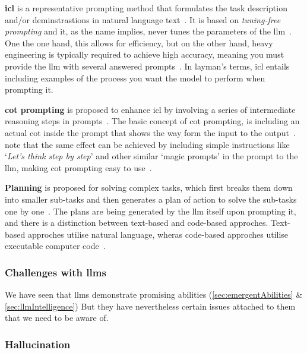\textbf{\acrfull{icl}} is a representative prompting method that formulates the task
description and/or deminstrastions in natural language text~\cite[44]{llmSurvey}. It is based on
\textit{tuning-free prompting} and it, as the name implies, never tunes the parameters of the
\acrshort{llm}~\cite[15]{promptingSurvey}. One the one hand, this allows for efficiency, but on the
other hand, heavy engineering is typically required to achieve high accuracy, meaning you must
provide the \acrshort{llm} with several answered prompts~\cite[16]{promptingSurvey}. In layman's
terms, \acrshort{icl} entails including examples of the process you want the model to perform when
prompting it.

\textbf{\acrfull{cot} prompting} is proposed to enhance \acrlong{icl} by involving a
series of intermediate reasoning steps in prompts~\cite[44, 52]{llmSurvey}. The basic concept of
\acrshort{cot} prompting, is including an actual \acrlong{cot} inside the prompt that shows the way
form the input to the output~\cite[52]{llmSurvey}.~\citeauthor{llmSurvey} note that the same effect
can be achieved by including simple instructions like `\textit{Let's think step by step}' and other
similar `magic prompts' in the prompt to the \acrshort{llm}, making \acrshort{cot} prompting easy to
use~\cite[52]{llmSurvey}.

\textbf{Planning} is proposed for solving complex tasks, which first breaks them down into smaller
sub-tasks and then generates a plan of action to solve the sub-tasks one by
one~\cite[44, 54]{llmSurvey}. The plans are being generated by the \acrshort{llm} itself upon
prompting it, and there is a distinction between text-based and code-based approches. Text-based
approches utilise natural language, wheras code-based approches utilise executable computer code~\cite[54-55]{llmSurvey}.


\subsubsection{Challenges with \acrshort{llms}}\label{sec:llmProblems}

We have seen that \acrshort{llms} demonstrate promising abilities
(\cref{sec:emergentAbilities} \& \cref{sec:llmIntelligence}) But they have nevertheless
certain issues attached to them that we need to be aware of.

\subsubsection*{Hallucination}

